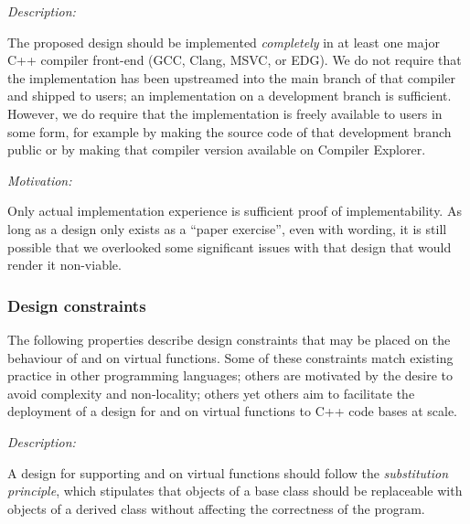 
\emph{Description:}

The proposed design should be implemented \emph{completely} in at least one major C++ compiler front-end (GCC, Clang, MSVC, or EDG). We do not require that the implementation has been upstreamed into the main branch of that compiler and shipped to users; an implementation on a development branch is sufficient. However, we do require that the implementation is freely available to users in some form, for example by making the source code of that development branch public or by making that compiler version available on Compiler Explorer.

\emph{Motivation:}

Only actual implementation experience is sufficient proof of implementability. As long as a design only exists as a ``paper exercise'', even with wording, it is still possible that we overlooked some significant issues with that design that would render it non-viable.

\subsubsection{Design constraints}

The following properties describe design constraints that may be placed on the behaviour of  and  on virtual functions. Some of these constraints match existing practice in other programming languages; others are motivated by the desire to avoid complexity and non-locality; others yet others aim to facilitate the deployment of a design for  and  on virtual functions to C++ code bases at scale.


\emph{Description:}

A design for supporting  and  on virtual functions should follow the \emph{substitution principle}, which stipulates that objects of a base class should be replaceable with objects of a derived class without affecting the correctness of the program. 


